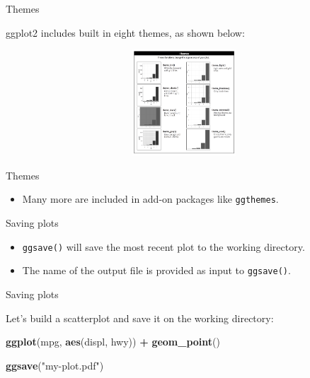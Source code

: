 \documentclass[ignorenonframetext,]{beamer}
\newenvironment{Shaded}{\begin{snugshade}}{\end{snugshade}}
\newcommand{\KeywordTok}[1]{\textcolor[rgb]{0.13,0.29,0.53}{\textbf{#1}}}
\newcommand{\NormalTok}[1]{#1}
\newcommand{\OperatorTok}[1]{\textcolor[rgb]{0.81,0.36,0.00}{\textbf{#1}}}
\newcommand{\StringTok}[1]{\textcolor[rgb]{0.31,0.60,0.02}{#1}}
\providecommand{\tightlist}{%
  \setlength{\itemsep}{0pt}\setlength{\parskip}{0pt}}
\begin{document}
\begin{frame}{Themes}
\protect\hypertarget{themes-2}{}

ggplot2 includes built in eight themes, as shown below:

\begin{center}\includegraphics[width=600px,height=150px]{themes} \end{center}

\end{frame}

\begin{frame}[fragile]{Themes}
\protect\hypertarget{themes-3}{}

\begin{itemize}
\tightlist
\item
  Many more are included in add-on packages like \texttt{ggthemes}.
\end{itemize}

\end{frame}

\begin{frame}[fragile]{Saving plots}
\protect\hypertarget{saving-plots}{}

\begin{itemize}
\item
  \texttt{ggsave()} will save the most recent plot to the working
  directory.
\item
  The name of the output file is provided as input to \texttt{ggsave()}.
\end{itemize}

\end{frame}

\begin{frame}[fragile]{Saving plots}
\protect\hypertarget{saving-plots-1}{}

Let's build a scatterplot and save it on the working directory:

\begin{Shaded}
\begin{Highlighting}[]
\KeywordTok{ggplot}\NormalTok{(mpg, }\KeywordTok{aes}\NormalTok{(displ, hwy)) }\OperatorTok{+}
\StringTok{  }\KeywordTok{geom_point}\NormalTok{()}

\KeywordTok{ggsave}\NormalTok{(}\StringTok{"my-plot.pdf"}\NormalTok{)}
\end{Highlighting}
\end{Shaded}

\end{frame}
\end{document}
